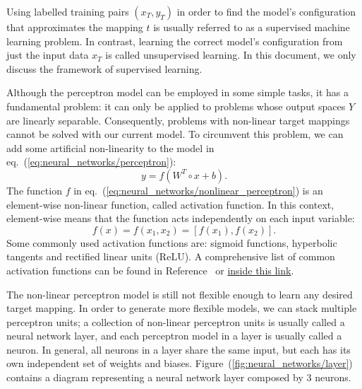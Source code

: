 Using labelled training pairs $(x_T, y_T)$ in order to find the model's configuration that
approximates the mapping $t$ is usually referred to as a supervised machine learning problem. In
contrast, learning the correct model's configuration from just the input data $x_T$ is called
unsupervised learning. In this document, we only discuss the framework of supervised learning.

Although the perceptron model can be employed in some simple tasks, it has a fundamental problem: it
can only be applied to problems whose output spaces $Y$ are linearly separable. Consequently,
problems with non-linear target mappings cannot be solved with our current model. To circumvent this
problem, we can add some artificial non-linearity to the model in
eq.~(\ref{eq:neural_networks/perceptron}):
\begin{equation}
    y = f(W^T \circ x + b).
    \label{eq:neural_networks/nonlinear_perceptron}
\end{equation}
The function $f$ in eq.~(\ref{eq:neural_networks/nonlinear_perceptron}) is an element-wise
non-linear function, called activation function. In this context, element-wise means that the
function acts independently on each input variable:
\begin{equation}
   f(x) = f(x_1, x_2) = [f(x_1), f(x_2)].
\end{equation}
Some commonly used activation functions are: sigmoid functions, hyperbolic tangents and rectified
linear units (ReLU). A comprehensive list of common activation functions can be found in
Reference~\cite{PyTorch} or \href{https://pytorch.org/docs/stable/nn.html}{inside this link}.

The non-linear perceptron model is still not flexible enough to learn any desired target mapping. In
order to generate more flexible models, we can stack multiple perceptron units; a collection of
non-linear perceptron units is usually called a neural network layer, and each perceptron model in a
layer is usually called a neuron. In general, all neurons in a layer share the same input, but each
has its own independent set of weights and biases. Figure~(\ref{fig:neural_networks/layer}) contains
a diagram representing a neural network layer composed by $3$ neurons. 

